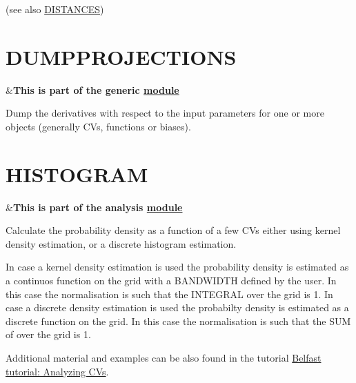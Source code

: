(see also \hyperlink{DISTANCES}{D\+I\+S\+T\+A\+N\+C\+E\+S}) \hypertarget{DUMPPROJECTIONS}{}\section{D\+U\+M\+P\+P\+R\+O\+J\+E\+C\+T\+I\+O\+N\+S}\label{DUMPPROJECTIONS}
\begin{TabularC}{2}
\hline
&{\bfseries  This is part of the generic \hyperlink{mymodules}{module }}   \\
\end{TabularC}
Dump the derivatives with respect to the input parameters for one or more objects (generally C\+Vs, functions or biases). \hypertarget{HISTOGRAM}{}\section{H\+I\+S\+T\+O\+G\+R\+A\+M}\label{HISTOGRAM}
\begin{TabularC}{2}
\hline
&{\bfseries  This is part of the analysis \hyperlink{mymodules}{module }}   \\
\end{TabularC}
Calculate the probability density as a function of a few C\+Vs either using kernel density estimation, or a discrete histogram estimation.

In case a kernel density estimation is used the probability density is estimated as a continuos function on the grid with a B\+A\+N\+D\+W\+I\+D\+T\+H defined by the user. In this case the normalisation is such that the I\+N\+T\+E\+G\+R\+A\+L over the grid is 1. In case a discrete density estimation is used the probabilty density is estimated as a discrete function on the grid. In this case the normalisation is such that the S\+U\+M of over the grid is 1.

Additional material and examples can be also found in the tutorial \hyperlink{belfast-1}{Belfast tutorial\+: Analyzing C\+Vs}.

